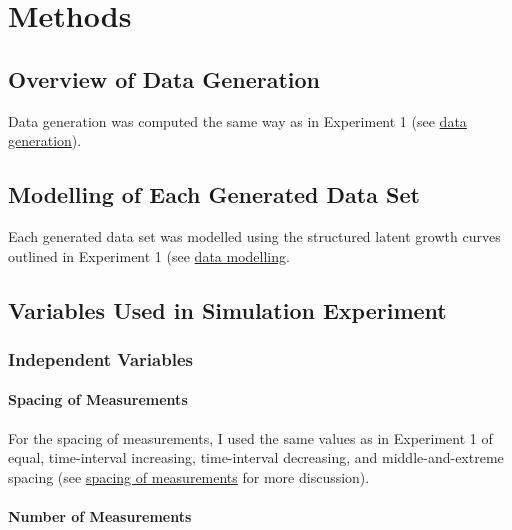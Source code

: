\documentclass[
12pt, %
twoside,
english]{guelphthesis}
\begin{document}
\hypertarget{methods-1}{%
\section{Methods}\label{methods-1}}

\hypertarget{overview-of-data-generation}{%
\subsection{Overview of Data Generation}\label{overview-of-data-generation}}

Data generation was computed the same way as in Experiment 1 (see \protect\hyperlink{data-generation}{data generation}).

\hypertarget{data-modelling-exp2}{%
\subsection{Modelling of Each Generated Data Set}\label{data-modelling-exp2}}

Each generated data set was modelled using the structured latent growth curves outlined in Experiment 1 (see \protect\hyperlink{data-modelling}{data modelling}.

\hypertarget{variables-used-in-simulation-experiment-1}{%
\subsection{Variables Used in Simulation Experiment}\label{variables-used-in-simulation-experiment-1}}

\hypertarget{independent-variables-1}{%
\subsubsection{Independent Variables}\label{independent-variables-1}}

\hypertarget{spacing-of-measurements-1}{%
\paragraph{Spacing of Measurements}\label{spacing-of-measurements-1}}

For the spacing of measurements, I used the same values as in Experiment 1 of equal, time-interval increasing, time-interval decreasing, and middle-and-extreme spacing (see \protect\hyperlink{spacing-measurements}{spacing of measurements} for more discussion).

\hypertarget{number-of-measurements-1}{%
\paragraph{Number of Measurements}\label{number-of-measurements-1}}
\end{document}
